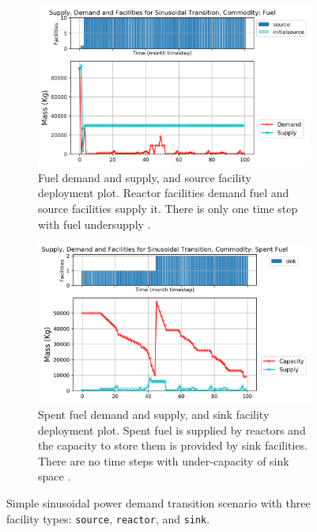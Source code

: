     \begin{figure}[]
        \centering
        \begin{subfigure}[t]{\textwidth}
            \centering
            \includegraphics[width=0.9\linewidth]{figures/sinetransition-fuel.png} 
            \caption{Fuel demand and supply, and source facility deployment plot.
            Reactor facilities demand fuel and source facilities supply it.
            There is only one time step with fuel undersupply \cite{chee_arfc/transition-scenarios_2018}.}
            \label{fig:sinetransition-fuel}
        \end{subfigure}
        \begin{subfigure}[t]{\textwidth}
            \centering
            \includegraphics[width=0.9\linewidth]{figures/sinetransition-spentfuel.png} 
            \caption{Spent fuel demand and supply, and sink facility deployment plot.
                Spent fuel is supplied by reactors and the capacity to store them 
                is provided by sink facilities.
            There are no time steps with under-capacity of sink space \cite{chee_arfc/transition-scenarios_2018}.}
            \label{fig:sinetransition-spentfuel}
        \end{subfigure}
        \caption{Simple sinusoidal power demand transition scenario with 
        three facility types: \texttt{source}, \texttt{reactor}, and \texttt{sink}.}
    \end{figure}

